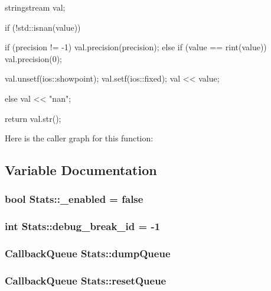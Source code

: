 \begin{DoxyCode}
{
    stringstream val;

    if (!std::isnan(value)) {
        if (precision != -1)
            val.precision(precision);
        else if (value == rint(value))
            val.precision(0);

        val.unsetf(ios::showpoint);
        val.setf(ios::fixed);
        val << value;
    } else {
        val << "nan";
    }

    return val.str();
}
\end{DoxyCode}


Here is the caller graph for this function:




\subsection{Variable Documentation}
\hypertarget{namespaceStats_ae793c31e3372c51a4996ce57cc219a54}{
\subsubsection[{\_\-enabled}]{\setlength{\rightskip}{0pt plus 5cm}bool {\bf Stats::\_\-enabled} = false}}
\label{namespaceStats_ae793c31e3372c51a4996ce57cc219a54}
\hypertarget{namespaceStats_abacf74f0010f42902b864f51751d05c9}{
\subsubsection[{debug\_\-break\_\-id}]{\setlength{\rightskip}{0pt plus 5cm}int {\bf Stats::debug\_\-break\_\-id} = -\/1}}
\label{namespaceStats_abacf74f0010f42902b864f51751d05c9}
\hypertarget{namespaceStats_a84952ecad0a9644e0ea9526b3736c8b7}{
\subsubsection[{dumpQueue}]{\setlength{\rightskip}{0pt plus 5cm}CallbackQueue {\bf Stats::dumpQueue}}}
\label{namespaceStats_a84952ecad0a9644e0ea9526b3736c8b7}
\hypertarget{namespaceStats_a052117624dd534c773035ba2e03f4474}{
\subsubsection[{resetQueue}]{\setlength{\rightskip}{0pt plus 5cm}CallbackQueue {\bf Stats::resetQueue}}}
\label{namespaceStats_a052117624dd534c773035ba2e03f4474}

